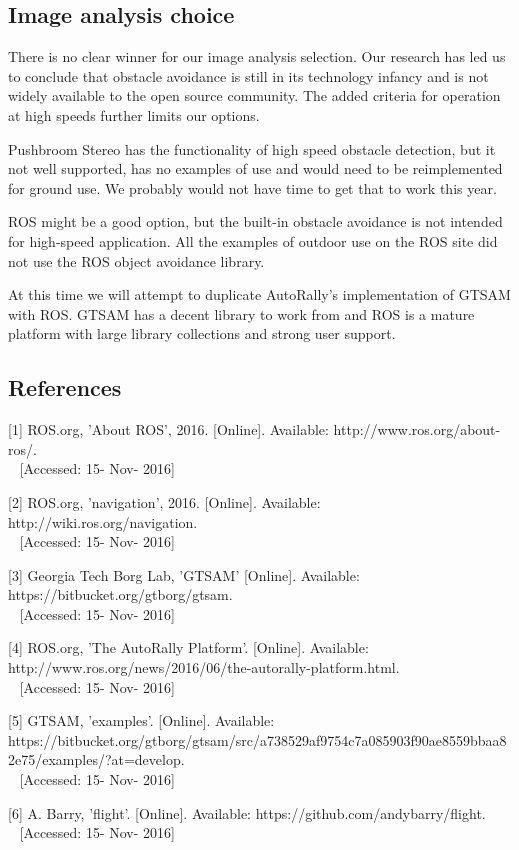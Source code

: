 \documentclass[compsoc,draftclsnofoot,onecolumn,10pt]{IEEEtran}
\begin{document}
\subsection{Image analysis choice}
There is no clear winner for our image analysis selection. Our research has led
us to conclude that obstacle avoidance is still in its technology infancy and is
not widely available to the open source community. The added criteria for
operation at high speeds further limits our options.\par
Pushbroom Stereo has the functionality of high speed obstacle detection, but it
not well supported, has no examples of use and would need to be reimplemented
for ground use. We probably would not have time to get that to work this
year.\par
ROS might be a good option, but the built-in obstacle avoidance is not intended for
high-speed application. All the examples of outdoor use on the ROS site did not
use the ROS object avoidance library.\par
At this time we will attempt to duplicate AutoRally's implementation
of GTSAM with ROS. GTSAM has a decent library to work from and ROS is a mature
platform with large library collections and strong user support. 

\subsection{References}
[1] ROS.org, 'About ROS', 2016. [Online]. Available: http://www.ros.org/about-ros/.\\~
[Accessed: 15- Nov- 2016]

[2] ROS.org, 'navigation', 2016. [Online]. Available: http://wiki.ros.org/navigation.\\~
[Accessed: 15- Nov- 2016]

[3] Georgia Tech Borg Lab, 'GTSAM' [Online]. Available:
https://bitbucket.org/gtborg/gtsam.\\~
[Accessed: 15- Nov- 2016]

[4] ROS.org, 'The AutoRally Platform'. [Online]. Available: http://www.ros.org/news/2016/06/the-autorally-platform.html.\\~
[Accessed: 15- Nov- 2016]

[5] GTSAM, 'examples'. [Online]. Available:
https://bitbucket.org/gtborg/gtsam/src/a738529af9754c7a085903f90ae8559bbaa82e75/examples/?at=develop.\\~
[Accessed: 15- Nov- 2016]

[6] A. Barry, 'flight'. [Online]. Available:
https://github.com/andybarry/flight.\\~
[Accessed: 15- Nov- 2016]
\end{document}
